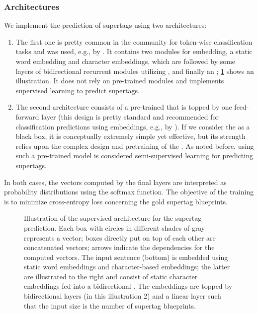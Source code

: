 \documentclass[../document.tex]{subfiles}
\begin{document}
    \subsubsection{Architectures}\label{sec:models}
    We implement the prediction of supertags using two architectures:
    \begin{enumerate}
        \item
            The first one is pretty common in the  community for token-wise classification tasks and was used, e.g., by \citet{vaswani2016supertagging,StaSte20,Cor20}.
            It contains two modules for embedding, a static word embedding and character embeddings, which are followed by some layers of bidirectional recurrent modules utilizing , and finally an ; \cref{fig:architecture:supervised} shows an illustration.
            It does not rely on pre-trained modules and implements supervised learning to predict supertags.
        \item
            The second architecture consists of a pre-trained  that is topped by one feed-forward layer (this design is pretty standard and recommended for classification predictions using  embeddings, e.g., by \citet{Devlin2019}).
            If we consider the  as a black box, it is conceptually extremely simple yet effective, but its strength relies upon the complex design and pretraining of the .
            As noted before, using such a pre-trained model is considered semi-supervised learning for predicting supertags.
    \end{enumerate}
    In both cases, the vectors computed by the final layers are interpreted as probability distributions using the softmax function.
    The objective of the training is to minimize cross-entropy loss concerning the gold supertag blueprints.

    \begin{figure}
        \centering
        
        \caption{\label{fig:architecture:supervised}
            Illustration of the supervised  architecture for the supertag prediction.
            Each box with circles in different shades of gray represents a vector; boxes directly put on top of each other are concatenated vectors; arrows indicate the dependencies for the computed vectors.
            The input sentence (bottom) is embedded using static word embeddings and character-based embeddings; the latter are illustrated to the right and consist of static character embeddings fed into a bidirectional .
            The embeddings are topped by bidirectional  layers (in this illustration 2) and a linear layer such that the input size is the number of supertag blueprints.
        }
    \end{figure}


    \ifSubfilesClassLoaded{%
        \printindex
    }{}
\end{document}
